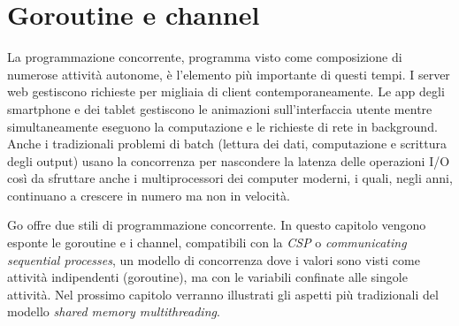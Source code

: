 \documentclass[../thesis.tex]{subfiles}
\begin{document}
    \newpage


    \section{Goroutine e channel}\label{sec:goroutine-e-channel}
    La programmazione concorrente, programma visto come composizione di numerose attività autonome, è l'elemento più importante di questi tempi.
    I server web gestiscono richieste per migliaia di client contemporaneamente.
    Le app degli smartphone e dei tablet gestiscono le animazioni sull'interfaccia utente mentre simultaneamente eseguono la computazione e le richieste di rete in background.
    Anche i tradizionali problemi di batch (lettura dei dati, computazione e scrittura degli output) usano la concorrenza per nascondere la latenza delle operazioni I/O così da sfruttare anche i multiprocessori dei computer moderni, i quali, negli anni, continuano a crescere in numero ma non in velocità.
    \hfill \vspace{12pt}

    Go offre due stili di programmazione concorrente.
    In questo capitolo vengono esponte le goroutine e i channel, compatibili con la \textit{CSP} o \textit{communicating sequential processes}, un modello di concorrenza dove i valori sono visti come attività indipendenti (goroutine), ma con le variabili confinate alle singole attività.
    Nel prossimo capitolo verranno illustrati gli aspetti più tradizionali del modello \textit{shared memory multithreading}.
    
    
    
    
    \clearpage
\end{document}

